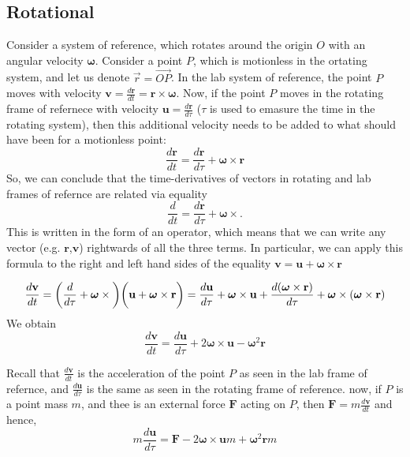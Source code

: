 \subsection{Rotational}
Consider a system of reference, which rotates around the origin $O$ with an angular velocity $\boldsymbol{\omega}$. Consider a point $P$, which is motionless in the ortating system, and let us denote $\vec{r}=\vec{OP}$.
In the lab system of reference, the point $P$ moves with velocity $\mathbf{v}=\frac{d\mathbf{r}}{dt}=\mathbf{r} \times \boldsymbol{\omega}$. Now, if the point $P$ moves in the rotating frame of refernece with velocity $\mathbf{u}=\frac{d\mathbf{r}}{d\tau}$ ($\tau$ is used to emasure the time in the rotating system), then this additional velocity needs to be added to what should have been for a motionless point:
$$\frac{d\mathbf{r}}{dt}=\frac{d\mathbf{r}}{d\tau}+\boldsymbol{\omega}\times \mathbf{r}$$
So, we can conclude that the time-derivatives of vectors in rotating and lab frames of refernce are related via equality
$$\frac{d}{dt}=\frac{d\mathbf{r}}{d\tau}+\boldsymbol{\omega}\times . $$
This is written in the form of an operator, which means that we can write any vector (e.g. $\mathbf{r}$,$\mathbf{v}$) rightwards of all the three terms. In particular, we can apply this formula to the right and left hand sides of the equality $\mathbf{v}=\mathbf{u}+\boldsymbol{\omega} \times \mathbf{r}$

$$\frac{d\mathbf{v}}{dt}=\bigg(\frac{d}{d\tau}+\boldsymbol{\omega}\times\bigg)\bigg(\mathbf{u}+\boldsymbol{\omega}\times\mathbf{r}\bigg)
    \\
    = \frac{d\mathbf{u}}{d\tau}+\boldsymbol{\omega}\times\mathbf{u}+\frac{d(\boldsymbol{\omega}\times \mathbf{r})}{d\tau}+\boldsymbol{\omega}\times(\boldsymbol{\omega}\times \mathbf{r})$$
We obtain
$$\frac{d\mathbf{v}}{dt}=\frac{d\mathbf{u}}{d\tau}+2\boldsymbol{\omega}\times\mathbf{u}-\boldsymbol{\omega}^2\mathbf{r}$$

Recall that $\frac{d\mathbf{v}}{dt}$ is the acceleration of the point $P$ as seen in the lab frame of refernce, and $\frac{d\mathbf{u}}{d\tau}$ is the same as seen in the rotating frame of reference. now, if $P$ is a point mass $m$, and thee is an external force $\mathbf{F}$ acting on $P$, then $\mathbf{F}=m\frac{d\mathbf{v}}{dt}$ and hence,
$$m\frac{d\mathbf{u}}{d\tau}=\mathbf{F}-2\boldsymbol{\omega}\times\mathbf{u}m+\boldsymbol{\omega}^2\mathbf{r}m$$
